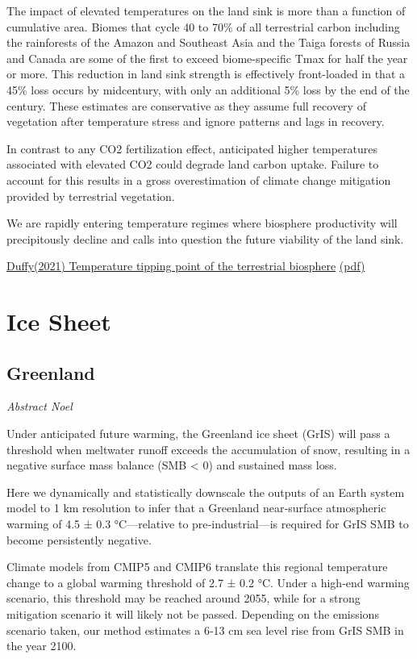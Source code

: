 \documentclass[
]{book}
\begin{document}
The impact of elevated temperatures on the land sink is more than a
function of cumulative area.
Biomes that cycle 40 to 70\% of all terrestrial carbon
including the rainforests of the Amazon and Southeast Asia and
the Taiga forests of Russia and Canada
are some of the first to exceed biome-specific Tmax
for half the year or more.
This reduction in land sink strength is effectively front-loaded
in that a 45\% loss occurs by midcentury,
with only an additional 5\% loss by the end of the century.
These estimates are conservative as they assume
full recovery of vegetation after temperature stress and
ignore patterns and lags in recovery.

In contrast to any CO2 fertilization effect,
anticipated higher temperatures associated with
elevated CO2 could degrade land carbon uptake.
Failure to account for this results in
a gross overestimation of climate change mitigation provided by terrestrial vegetation.

We are rapidly entering temperature regimes where biosphere productivity
will precipitously decline and
calls into question the future viability of the land sink.

\href{https://advances.sciencemag.org/content/7/3/eaay1052}{Duffy(2021) Temperature tipping point of the terrestrial biosphere}
\href{pdf/Duffy_2020_Temperature_Tipping_Point.pdf}{(pdf)}

\hypertarget{ice-sheet}{%
\chapter{Ice Sheet}\label{ice-sheet}}

\hypertarget{greenland}{%
\section{Greenland}\label{greenland}}

\emph{Abstract Noel}

Under anticipated future warming, the Greenland ice sheet (GrIS) will
pass a threshold when meltwater runoff exceeds the accumulation of snow,
resulting in a negative surface mass balance (SMB \textless{} 0) and sustained mass loss.

Here we dynamically and statistically downscale the outputs of an
Earth system model to 1 km resolution to infer that a Greenland near‐surface
atmospheric warming of 4.5 ± 0.3 °C---relative to pre‐industrial---is required
for GrIS SMB to become persistently negative.

Climate models from CMIP5 and CMIP6 translate this regional temperature change
to a global warming threshold of 2.7 ± 0.2 °C.
Under a high‐end warming scenario, this threshold may be reached around 2055,
while for a strong mitigation scenario it will likely not be passed.
Depending on the emissions scenario taken, our method estimates a 6‐13 cm sea level rise
from GrIS SMB in the year 2100.
\end{document}
